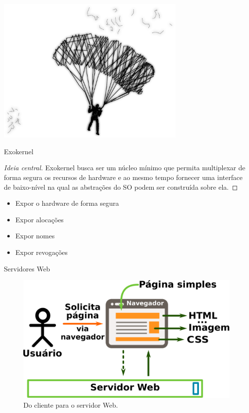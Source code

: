 \documentclass[xcolor={usenames,svgnames,dvipsnames},brazil,english,12pt,aspectratio=149]{beamer}
\begin{document}
\begin{frame}[plain]
  \includegraphics[width=0.7\textwidth]{presentation_cap2_nine}
\end{frame}

\begin{frame}{Exokernel}
  \begin{proof}[Ideia central]
Exokernel busca ser um núcleo mínimo que permita multiplexar de forma segura os
recursos de hardware e ao mesmo tempo fornecer uma interface de baixo-nível na
qual as abstrações do SO podem ser construída sobre ela.
  \end{proof}

  \begin{itemize}
    \item Expor o hardware de forma segura
    \item Expor alocações
    \item Expor nomes
    \item Expor revogações
  \end{itemize}

\end{frame}

\begin{frame}{Servidores Web}
  \begin{figure}[!h]
    \centering
    \includegraphics[width=.50\textwidth]{request_a_page}
    \caption{Do cliente para o servidor Web.}
    \label{fig:client_to_web_server}
  \end{figure}
\end{frame}
\end{document}
